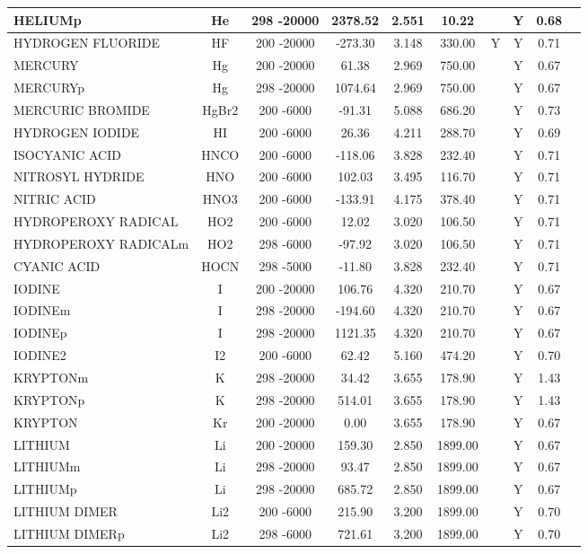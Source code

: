 \begin{longtable}{@{\extracolsep{\fill}}|l|c|c|c|c|c|c|c|c|l|}
HELIUMp&He&298 -20000& 2378.52& 2.551&    10.22& &Y& 0.68&\\ \hline
HYDROGEN FLUORIDE&HF&200 -20000& -273.30& 3.148&   330.00&Y&Y& 0.71&\\ \hline
MERCURY&Hg&200 -20000&   61.38& 2.969&   750.00& &Y& 0.67&\\ \hline
MERCURYp&Hg&298 -20000& 1074.64& 2.969&   750.00& &Y& 0.67&\\ \hline
MERCURIC BROMIDE&HgBr2&200 -6000&  -91.31& 5.088&   686.20& &Y& 0.73&\\ \hline
HYDROGEN IODIDE&HI&200 -6000&   26.36& 4.211&   288.70& &Y& 0.69&\\ \hline
ISOCYANIC ACID&HNCO&200 -6000& -118.06& 3.828&   232.40& &Y& 0.71&\\ \hline
NITROSYL HYDRIDE&HNO&200 -6000&  102.03& 3.495&   116.70& &Y& 0.71&\\ \hline
NITRIC ACID&HNO3&200 -6000& -133.91& 4.175&   378.40& &Y& 0.71&\\ \hline
HYDROPEROXY RADICAL&HO2&200 -6000&   12.02& 3.020&   106.50& &Y& 0.71&\\ \hline
HYDROPEROXY RADICALm&HO2&298 -6000&  -97.92& 3.020&   106.50& &Y& 0.71&\\ \hline
CYANIC ACID&HOCN&298 -5000&  -11.80& 3.828&   232.40& &Y& 0.71&\\ \hline
IODINE&I&200 -20000&  106.76& 4.320&   210.70& &Y& 0.67&\\ \hline
IODINEm&I&298 -20000& -194.60& 4.320&   210.70& &Y& 0.67&\\ \hline
IODINEp&I&298 -20000& 1121.35& 4.320&   210.70& &Y& 0.67&\\ \hline
IODINE2&I2&200 -6000&   62.42& 5.160&   474.20& &Y& 0.70&\\ \hline
KRYPTONm&K&298 -20000&   34.42& 3.655&   178.90& &Y& 1.43&\\ \hline
KRYPTONp&K&298 -20000&  514.01& 3.655&   178.90& &Y& 1.43&\\ \hline
KRYPTON&Kr&200 -20000&    0.00& 3.655&   178.90& &Y& 0.67&\\ \hline
LITHIUM&Li&200 -20000&  159.30& 2.850&  1899.00& &Y& 0.67&\\ \hline
LITHIUMm&Li&298 -20000&   93.47& 2.850&  1899.00& &Y& 0.67&\\ \hline
LITHIUMp&Li&298 -20000&  685.72& 2.850&  1899.00& &Y& 0.67&\\ \hline
LITHIUM DIMER&Li2&200 -6000&  215.90& 3.200&  1899.00& &Y& 0.70&\\ \hline
LITHIUM DIMERp&Li2&298 -6000&  721.61& 3.200&  1899.00& &Y& 0.70&\\ \hline

\end{longtable}
